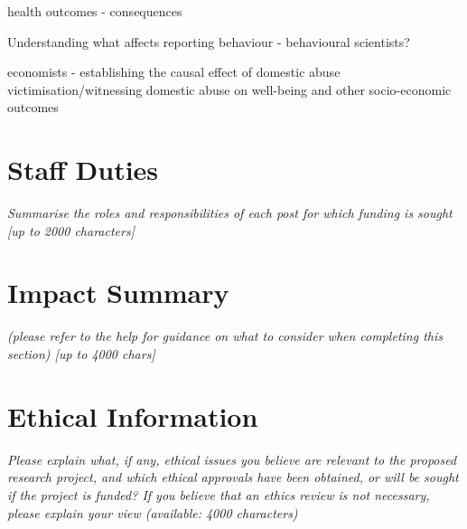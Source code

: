 \documentclass[11pt, a4paper]{article}
\begin{document}
health outcomes - consequences 
 
Understanding what affects reporting behaviour - behavioural scientists?

economists - establishing the causal effect of domestic abuse victimisation/witnessing domestic abuse on well-being and other socio-economic outcomes






\section{Staff Duties}

\textit{Summarise the roles and responsibilities of each post for which funding is sought [up to 2000 characters]}

\section{Impact Summary }

%
%
%
%
%
%
%
%



\textit{(please refer to the help for guidance on what to consider when completing this section) [up to 4000 chars]}

\section{Ethical Information}

\textit{Please explain what, if any, ethical issues you believe are relevant to the proposed research project, and which ethical approvals have been obtained, or will be sought if the project is funded? If you believe that an ethics review is not necessary, please explain your view (available: 4000 characters)}
\end{document}
